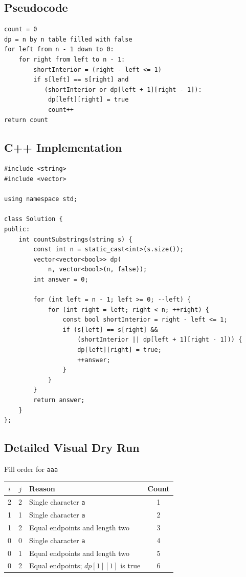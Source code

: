 \subsection{Pseudocode}
\begin{lstlisting}[style=pseudocode]
count = 0
dp = n by n table filled with false
for left from n - 1 down to 0:
    for right from left to n - 1:
        shortInterior = (right - left <= 1)
        if s[left] == s[right] and
           (shortInterior or dp[left + 1][right - 1]):
            dp[left][right] = true
            count++
return count
\end{lstlisting}

\subsection{C++ Implementation}
\begin{lstlisting}[style=compactcode,caption={Complete C++ solution: Palindromic Substrings}]
#include <string>
#include <vector>

using namespace std;

class Solution {
public:
    int countSubstrings(string s) {
        const int n = static_cast<int>(s.size());
        vector<vector<bool>> dp(
            n, vector<bool>(n, false));
        int answer = 0;

        for (int left = n - 1; left >= 0; --left) {
            for (int right = left; right < n; ++right) {
                const bool shortInterior = right - left <= 1;
                if (s[left] == s[right] &&
                    (shortInterior || dp[left + 1][right - 1])) {
                    dp[left][right] = true;
                    ++answer;
                }
            }
        }
        return answer;
    }
};
\end{lstlisting}

\subsection{Detailed Visual Dry Run}
\begin{dryrunbox}{Fill order for \texttt{aaa}}
\begin{tabularx}{\linewidth}{@{}c c X c@{}}
\toprule
\(i\) & \(j\) & Reason & Count \\
\midrule
2 & 2 & Single character \texttt{a} & 1 \\
1 & 1 & Single character \texttt{a} & 2 \\
1 & 2 & Equal endpoints and length two & 3 \\
0 & 0 & Single character \texttt{a} & 4 \\
0 & 1 & Equal endpoints and length two & 5 \\
0 & 2 & Equal endpoints; \(dp[1][1]\) is true & 6 \\
\bottomrule
\end{tabularx}
\end{dryrunbox}


